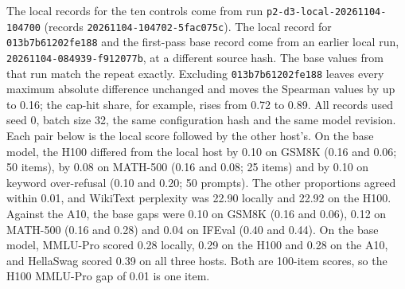 The local records for the ten controls come from run \texttt{p2-d3-local-20261104-104700} (records \texttt{20261104-104702-5fac075c}). The local record for \texttt{013b7b61202fe188} and the first-pass base record come from an earlier local run, \texttt{20261104-084939-f912077b}, at a different source hash. The base values from that run match the repeat exactly. Excluding \texttt{013b7b61202fe188} leaves every maximum absolute difference unchanged and moves the Spearman values by up to 0.16; the cap-hit share, for example, rises from 0.72 to 0.89. All records used seed 0, batch size 32, the same configuration hash and the same model revision. Each pair below is the local score followed by the other host's. On the base model, the H100 differed from the local host by 0.10 on GSM8K (0.16 and 0.06; 50 items), by 0.08 on MATH-500 (0.16 and 0.08; 25 items) and by 0.10 on keyword over-refusal (0.10 and 0.20; 50 prompts). The other proportions agreed within 0.01, and WikiText perplexity was 22.90 locally and 22.92 on the H100. Against the A10, the base gaps were 0.10 on GSM8K (0.16 and 0.06), 0.12 on MATH-500 (0.16 and 0.28) and 0.04 on IFEval (0.40 and 0.44). On the base model, MMLU-Pro scored 0.28 locally, 0.29 on the H100 and 0.28 on the A10, and HellaSwag scored 0.39 on all three hosts. Both are 100-item scores, so the H100 MMLU-Pro gap of 0.01 is one item.

